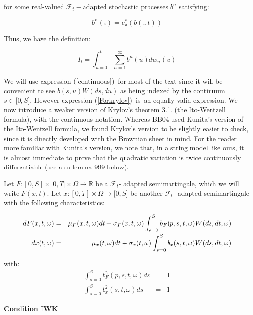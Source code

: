 \documentclass{article}
\begin{document}
for some real-valued $\mathcal{F}_{t}-$adapted stochastic processes $b^{n}$
satisfying:

\begin{equation*}
b^{n}(t)=e_{n}^{\ast }(b(.,t))
\end{equation*}

Thus, we have the definition:

\begin{equation}
I_{t}=\int_{u=0}^{t}\sum_{n=1}^{\infty }b^{n}(u)dw_{n}(u)  \label{Forkrylov}
\end{equation}

We will use expression (\ref{continuous})\ for most of the text since it
will be convenient to see $b(s,u)W(ds,du)$ as being indexed by the continuum 
$s\in \lbrack 0,S]$. However expression (\ref{Forkrylov})\ is\ an equally
valid expression. We now introduce a weaker version of Krylov's \cite{Kry09}
theorem 3.1. (the Ito-Wentzell formula), with the continuous notation.
Whereas BB04 used Kunita's version of the Ito-Wentzell formula, we found
Krylov's version to be slightly easier to check, since it is directly
developed with the Brownian sheet in mind. For the reader more familiar with
Kunita's version, we note that, in a string model like ours, it is almost
immediate to prove that the quadratic variation is twice continuously
differentiable (see also lemma 999 below).

\bigskip

Let $F:[0,S]\times \lbrack 0,T]\times \Omega \rightarrow \mathbb{R}$ be a $%
\mathcal{F}_{t}$- adapted semimartingale, which we will write $F(x,t)$. Let $%
x:[0,T]\times \Omega \rightarrow \lbrack 0,S]$ be another $\mathcal{F}_{t}$-
adapted semimartingale with the following characteristics:

\begin{eqnarray}
dF(x,t,\omega ) &=&\mu _{F}(x,t,\omega )dt+\sigma _{F}(x,t,\omega
)\int_{s=0}^{S}b_{F}(p,s,t,\omega )W(ds,dt,\omega )  \label{dQ} \\
dx(t,\omega ) &=&\mu _{x}(t,\omega )dt+\sigma _{x}(t,\omega
)\int_{s=0}^{S}b_{x}(s,t,\omega )W(ds,dt,\omega )  \notag
\end{eqnarray}

with:%
\begin{eqnarray*}
\int_{s=0}^{S}b_{F}^{2}(p,s,t,\omega )ds &=&1 \\
\int_{s=0}^{S}b_{x}^{2}(s,t,\omega )ds &=&1
\end{eqnarray*}%
\bigskip

\textbf{Condition IWK}
\end{document}
